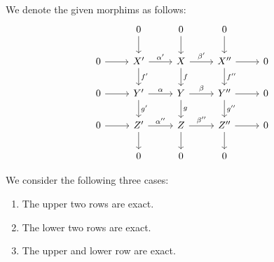 \section{}

We denote the given morphims as follows:
\begin{equation}
  \label{3x3 diagram}
  \begin{tikzcd}
      {}
    & 0
      \arrow{d}
    & 0
      \arrow{d}
    & 0
      \arrow{d}
    & {}
  \\
      0
      \arrow{r}
    & X'
      \arrow{r}[above]{\alpha'}
      \arrow{d}[right]{f'}
    & X
      \arrow{r}[above]{\beta'}
      \arrow{d}[right]{f}
    & X''
      \arrow{r}
      \arrow{d}[right]{f''}
    & 0
    \\
      0
      \arrow{r}
    & Y'
      \arrow{r}[above]{\alpha}
      \arrow{d}[right]{g'}
    & Y
      \arrow{r}[above]{\beta}
      \arrow{d}[right]{g}
    & Y''
      \arrow{r}
      \arrow{d}[right]{g''}
    & 0
    \\
      0
      \arrow{r}
    & Z'
      \arrow{r}[above]{\alpha''}
      \arrow{d}
    & Z
      \arrow{r}[above]{\beta''}
      \arrow{d}
    & Z''
      \arrow{r}
      \arrow{d}
    & 0
    \\
      {}
    & 0
    & 0
    & 0
    & {}
  \end{tikzcd}
\end{equation}


We consider the following three cases:

\begin{enumerate}[label = (\roman*)]
  \item
    The upper two rows are exact.
  \item
    The lower two rows are exact.
  \item
    The upper and lower row are exact.
\end{enumerate}





\subsection{}
\label{upper rows are exact}

